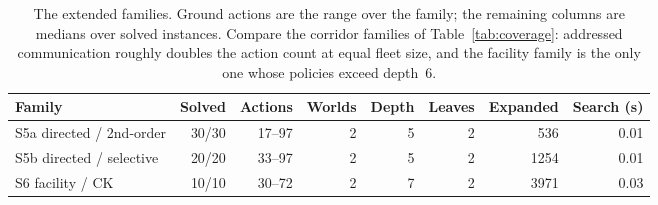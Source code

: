 \begin{table}[H]
\centering
\small
\caption{The extended families. Ground actions are the range over the family;
the remaining columns are medians over solved instances. Compare the corridor
families of Table~\ref{tab:coverage}: addressed communication roughly doubles
the action count at equal fleet size, and the facility family is the only one
whose policies exceed depth~6.}
\label{tab:extended}
\begin{tabular}{@{}l r r r r r r r@{}}
\toprule
\textbf{Family} & \textbf{Solved} & \textbf{Actions} & \textbf{Worlds}
 & \textbf{Depth} & \textbf{Leaves} & \textbf{Expanded} & \textbf{Search (s)} \\
\midrule
S5a directed / 2nd-order & 30/30 & 17--97 & 2 & 5 & 2 & 536 & 0.01 \\
S5b directed / selective & 20/20 & 33--97 & 2 & 5 & 2 & 1254 & 0.01 \\
S6 facility / CK & 10/10 & 30--72 & 2 & 7 & 2 & 3971 & 0.03 \\
\bottomrule
\end{tabular}
\end{table}
